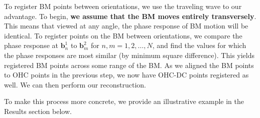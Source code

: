 \documentclass[preprint,NumberedRefs]{JASA}
\begin{document}
\par{To register BM points between orientations, we use the traveling wave to our advantage. To begin, \textbf{we assume that the BM moves entirely transversely}. This means that viewed at any angle, the phase response of BM motion will be identical. To register points on the BM between orientations, we compare the phase response at $\mathbf{b}^1_n$ to $\mathbf{b}^2_m$ for $n,m=1,2,\ldots,N$, and find the values for which the phase responses are most similar (by minimum square difference). This yields registered BM points across some range of the BM. As we aligned the BM points to OHC points in the previous step, we now have OHC-DC points registered as well. We can then perform our reconstruction.}
\par{To make this process more concrete, we provide an illustrative example in the Results section below.}
\end{document}
